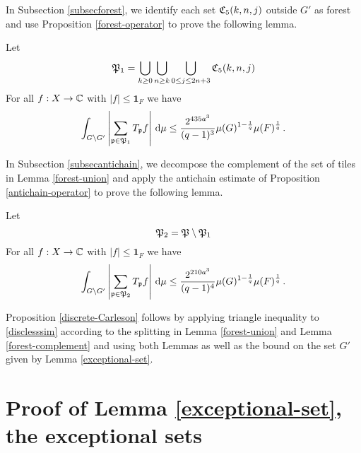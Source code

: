 {In Subsection \ref{subsecforest}, we identify each set ${\mathfrak C}_5(k,n,j)$ outside $G'$ as forest and use Proposition
\ref{forest-operator} to prove the following lemma.

\begin{lemma}
\label{forest-union}
  Let
  \begin{equation}
      {\mathfrak P}_1 =\bigcup_{k\ge 0}\bigcup_{n\ge k}
      \bigcup_{0\le j\le 2n+3}{\mathfrak C}_5(k,n,j)
  \end{equation}
  For all $f:X\to {\mathbb{C}}$ with $|f|\le \mathbf{1}_F$ we have
\begin{equation}
    \label{disclesssim1}
    \int_{G \setminus  G'} \left|\sum_{{\mathfrak p} \in {\mathfrak P}_1} T_{{\mathfrak p}} f \right|\, \mathrm{d}\mu  \le \frac{2^{435a^3}}{(q-1)^3} \mu(G)^{1 - \frac{1}{q}} \mu(F)^{\frac{1}{q}}\,.
\end{equation}
\end{lemma}

In Subsection \ref{subsecantichain}, we decompose
the complement of the set of tiles in Lemma
\ref{forest-union} and apply the antichain estimate of
Proposition \ref{antichain-operator} to prove the following lemma.

\begin{lemma}
\label{forest-complement}
  Let
  \begin{equation}
      \fP_2 =\fP\setminus \fP_1 %
  \end{equation}
 For all $f:X\to {\mathbb{C}}$ with $|f|\le \mathbf{1}_F$ we have
\begin{equation}
    \label{disclesssim2}
    \int_{G \setminus  G'} \left|\sum_{{\mathfrak p} \in {\mathfrak P}_2} T_{{\mathfrak p}} f\right| \, \mathrm{d}\mu  \le \frac{2^{210a^3}}{(q-1)^4} \mu(G)^{1 - \frac{1}{q}} \mu(F)^{\frac{1}{q}}\,.
\end{equation}
\end{lemma}
Proposition \ref{discrete-Carleson} follows by applying
triangle inequality to \eqref{disclesssim}
according to the splitting in Lemma \ref{forest-union}
and Lemma \ref{forest-complement} and using both Lemmas as well
as the bound on the set $G'$ given by Lemma \ref{exceptional-set}.


\section{Proof of Lemma \ref{exceptional-set}, the exceptional sets}
\label{subsetexcset}


}
